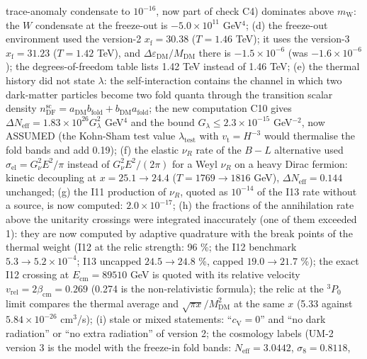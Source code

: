 \documentclass[
  10pt,
]{article}
\begin{document}
\begin{enumerate}
  trace-anomaly condensate to \(10^{-16}\), now part of check C4)
  dominates above \(m_{\mathrm{W}}\): the \(W\) condensate at the
  freeze-out is \(-5.0\times10^{11}\) GeV\(^4\); (d) the freeze-out
  environment used the version-2 \(x_{\mathrm{f}} = 30.38\)
  (\(T = 1.46\) TeV); it uses the version-3 \(x_{\mathrm{f}} = 31.23\)
  (\(T = 1.42\) TeV), and
  \(\Delta\varepsilon_{\mathrm{DM}}/M_{\mathrm{DM}}\) there is
  \(-1.5\times10^{-6}\) (was \(-1.6\times10^{-6}\)); the
  degrees-of-freedom table lists 1.42 TeV instead of 1.46 TeV; (e) the
  thermal history did not state \(\lambda\): the self-interaction
  contains the channel in which two dark-matter particles become two
  fold quanta through the transition scalar density
  \(n^{\mathrm{sc}}_{\mathrm{DF}} = a_{\mathrm{DM}}b_{\mathrm{fold}} + b_{\mathrm{DM}}a_{\mathrm{fold}}\);
  the new computation C10 gives
  \(\Delta N_{\mathrm{eff}} = 1.83\times10^{26}G_\lambda^2\) GeV\(^4\)
  and the bound \(G_\lambda \le 2.3\times10^{-15}\) GeV\(^{-2}\), now
  ASSUMED (the Kohn-Sham test value \(\lambda_{\mathrm{test}}\) with
  \(v_{\mathrm{t}} = H^{-3}\) would thermalise the fold bands and add
  0.19); (f) the elastic \(\nu_R\) rate of the \(B - L\) alternative
  used \(\sigma_{\mathrm{el}} = G_\nu^2E^2/\pi\) instead of
  \(G_\nu^2E^2/(2\pi)\) for a Weyl \(\nu_R\) on a heavy Dirac fermion:
  kinetic decoupling at \(x = 25.1 \to 24.4\) (\(T = 1769 \to 1816\)
  GeV), \(\Delta N_{\mathrm{eff}} = 0.144\) unchanged; (g) the I11
  production of \(\nu_R\), quoted as \(10^{-14}\) of the I13 rate
  without a source, is now computed: \(2.0\times10^{-17}\); (h) the
  fractions of the annihilation rate above the unitarity crossings were
  integrated inaccurately (one of them exceeded 1): they are now
  computed by adaptive quadrature with the break points of the thermal
  weight (I12 at the relic strength: 96 \%; the I12 benchmark
  \(5.3 \to 5.2\times10^{-4}\); I13 uncapped \(24.5 \to 24.8\) \%,
  capped \(19.0 \to 21.7\) \%); the exact I12 crossing at
  \(E_{\mathrm{cm}} = 89510\) GeV is quoted with its relative velocity
  \(v_{\mathrm{rel}} = 2\beta_{\mathrm{cm}} = 0.269\) (0.274 is the
  non-relativistic formula); the relic at the \(^3P_0\) limit compares
  the thermal average and \(\sqrt{\pi x}/M_{\mathrm{DM}}^2\) at the same
  \(x\) (5.33 against \(5.84\times10^{-26}\) cm\(^3\)/s); (i) stale or
  mixed statements: ``\(c_{\mathrm{V}} = 0\)'' and ``no dark radiation''
  or ``no extra radiation'' of version 2; the cosmology labels (UM-2
  version 3 is the model with the freeze-in fold bands:
  \(N_{\mathrm{eff}} = 3.0442\), \(\sigma_8 = 0.8118\),

\end{enumerate}
\end{document}
